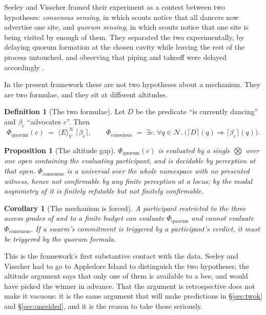 \documentclass[11pt,a4paper]{article}
\theoremstyle{plain}
\newtheorem{proposition}[theorem]{Proposition}
\newtheorem{corollary}[theorem]{Corollary}
\theoremstyle{definition}
\newtheorem{definition}[theorem]{Definition}
\theoremstyle{remark}
\newcommand{\gE}[2]{\langle E\rangle^{#1}_{#2}}
\newcommand{\Nsp}{\mathcal{N}}
\newcommand{\Val}{V}
\begin{document}
Seeley and Visscher framed their experiment as a contest between two
hypotheses: \emph{consensus sensing}, in which scouts notice that all dancers
now advertise one site, and \emph{quorum sensing}, in which scouts notice that
one site is being visited by enough of them. They separated the two
experimentally, by delaying quorum formation at the chosen cavity while leaving
the rest of the process untouched, and observing that piping and takeoff were
delayed accordingly \cite{SV04}.

In the present framework these are not two hypotheses about a mechanism. They
are two formulae, and they sit at different altitudes.

\begin{definition}[The two formulae]\label{def:twoformulae}
Let $D$ be the predicate ``is currently dancing'' and $\beta_c$ ``advocates
$c$''. Then
\[
\Phi_{\mathrm{quorum}}(c) \;=\; \gE{\Nsp}{\Val}\,\lceil\beta_c\rceil,
\qquad
\Phi_{\mathrm{consensus}} \;=\; \exists c.\ \forall q \in \Nsp.\
  \big(\lceil D\rceil(q) \Rightarrow \lceil\beta_c\rceil(q)\big).
\]
\end{definition}

\begin{proposition}[The altitude gap]\label{prop:whyquorum}
$\Phi_{\mathrm{quorum}}(c)$ is evaluated by a single $\bigotimes$ over one open
containing the evaluating participant, and is decidable by perception at that
open. $\Phi_{\mathrm{consensus}}$ is a universal over the whole namespace with
no presented witness, hence not confirmable by any finite perception at a
locus; by the modal asymmetry of \cite[Prop.~6]{scientist} it is finitely
refutable but not finitely confirmable.
\end{proposition}

\begin{corollary}[The mechanism is forced]\label{cor:forced}
A participant restricted to the three access grades of \cite{scientist} and to
a finite budget can evaluate $\Phi_{\mathrm{quorum}}$ and cannot evaluate
$\Phi_{\mathrm{consensus}}$. If a swarm's commitment is triggered by a
participant's verdict, it must be triggered by the quorum formula.
\end{corollary}

This is the framework's first substantive contact with the data. Seeley and
Visscher had to go to Appledore Island to distinguish the two hypotheses; the
altitude argument says that only one of them is available to a bee, and would
have picked the winner in advance. That the argument is retrospective does not
make it vacuous: it is the same argument that will make predictions in
\S\ref{sec:twok} and \S\ref{sec:onesided}, and it is the reason to take those
seriously.
\end{document}
